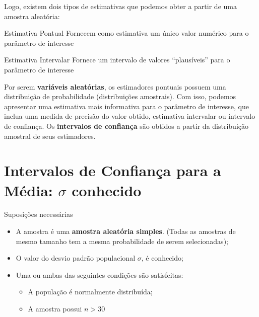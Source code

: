 \documentclass[14pt,aspectratio=1610]{beamer}
\begin{document}
\begin{frame}{}

Logo, existem dois tipos de estimativas que podemos obter a partir de uma amostra aleatória:
\begin{block}{Estimativa Pontual}
\justifying
Fornecem como estimativa um único valor numérico para o parâmetro de interesse  
\end{block}

\begin{block}{Estimativa Intervalar}
\justifying
Fornece um intervalo de valores ``plausíveis'' para o parâmetro de interesse    
\end{block}
\end{frame}

\begin{frame}{}
    \begin{block}{}
    \justifying
Por serem \textbf{variáveis aleatórias}, os estimadores pontuais possuem uma distribuição de probabilidade (distribuições amostrais). Com isso, podemos apresentar uma estimativa mais informativa para o parâmetro de interesse, que inclua uma medida de precisão do
valor obtido, estimativa intervalar ou intervalo de confiança. Os \textbf{intervalos de confiança} são obtidos a partir da distribuição amostral de seus estimadores.    
\end{block}
\end{frame}

\section{Intervalos de Confiança para a Média: $\sigma$ conhecido}
\begin{frame}{}
    \begin{block}{Suposições necessárias}
    \justifying
\begin{itemize}
    \item A amostra é uma \textbf{amostra aleatória simples}. (Todas as amostras de mesmo tamanho tem a mesma probabilidade de serem selecionadas);\pause
    \item O valor do desvio padrão populacional $\sigma$, é conhecido; \pause
    \item Uma ou ambas das seguintes condições são satisfeitas:
    \begin{itemize}
        \item A população é normalmente distribuída;
        \item A amostra possui $n > 30$
    \end{itemize}
\end{itemize}
    \end{block}
\end{frame}
\end{document}
